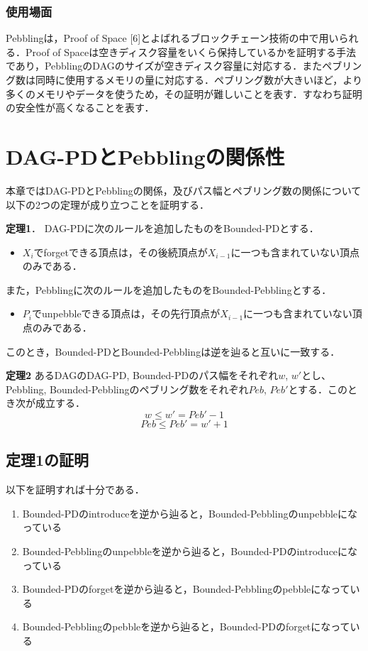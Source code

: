 \documentclass{kuisthesis}           %
\begin{document}
 
 \subsubsection{使用場面}
 Pebblingは，Proof of Space [6]とよばれるブロックチェーン技術の中で用いられる．Proof of Spaceは空きディスク容量をいくら保持しているかを証明する手法であり，PebblingのDAGのサイズが空きディスク容量に対応する．またペブリング数は同時に使用するメモリの量に対応する．ペブリング数が大きいほど，より多くのメモリやデータを使うため，その証明が難しいことを表す．すなわち証明の安全性が高くなることを表す．


 
 \section{DAG-PDとPebblingの関係性}\label{sec-structure}
 本章ではDAG-PDとPebblingの関係，及びパス幅とペブリング数の関係について以下の2つの定理が成り立つことを証明する．

 \textbf{定理1}．
 DAG-PDに次のルールを追加したものをBounded-PDとする．

 \begin{itemize}
  \item $X_i$でforgetできる頂点は，その後続頂点が$X_{i-1}$に一つも含まれていない頂点のみである．
 \end{itemize}

 また，Pebblingに次のルールを追加したものをBounded-Pebblingとする．

 \begin{itemize}
  \item $P_i$でunpebbleできる頂点は，その先行頂点が$X_{i-1}$に一つも含まれていない頂点のみである．
 \end{itemize}

 このとき，Bounded-PDとBounded-Pebblingは逆を辿ると互いに一致する．

 \textbf{定理2}
 あるDAGのDAG-PD, Bounded-PDのパス幅をそれぞれ$w$, $w'$とし、Pebbling, Bounded-Pebblingのペブリング数をそれぞれ$Peb$, $Peb'$とする．このとき次が成立する．
 \[ w \leq w'=Peb'-1 \]
 \[ Peb \leq Peb'=w'+1 \]


 \subsection{定理1の証明}
 以下を証明すれば十分である．
 
 \begin{enumerate}
 \item Bounded-PDのintroduceを逆から辿ると，Bounded-Pebblingのunpebbleになっている
 \item Bounded-Pebblingのunpebbleを逆から辿ると，Bounded-PDのintroduceになっている
 \item Bounded-PDのforgetを逆から辿ると，Bounded-Pebblingのpebbleになっている
 \item Bounded-Pebblingのpebbleを逆から辿ると，Bounded-PDのforgetになっている
 \end{enumerate}
\end{document}
